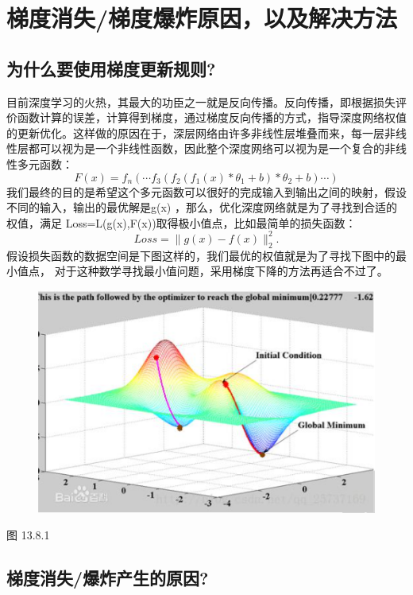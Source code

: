 \section{梯度消失/梯度爆炸原因，以及解决方法}\label{ux68afux5ea6ux6d88ux5931ux68afux5ea6ux7206ux70b8ux539fux56e0ux4ee5ux53caux89e3ux51b3ux65b9ux6cd5}

\subsection{为什么要使用梯度更新规则?}\label{ux4e3aux4ec0ux4e48ux8981ux4f7fux7528ux68afux5ea6ux66f4ux65b0ux89c4ux5219}

目前深度学习的火热，其最大的功臣之一就是反向传播。反向传播，即根据损失评价函数计算的误差，计算得到梯度，通过梯度反向传播的方式，指导深度网络权值的更新优化。这样做的原因在于，深层网络由许多非线性层堆叠而来，每一层非线性层都可以视为是一个非线性函数，因此整个深度网络可以视为是一个复合的非线性多元函数：
\[
F(x)=f_n(\cdots f_3(f_2(f_1(x)*\theta_1+b)*\theta_2+b)\cdots)
\]
我们最终的目的是希望这个多元函数可以很好的完成输入到输出之间的映射，假设不同的输入，输出的最优解是g(x)
，那么，优化深度网络就是为了寻找到合适的权值，满足
Loss=L(g(x),F(x))取得极小值点，比如最简单的损失函数： \[
Loss = \lVert g(x)-f(x) \rVert^2_2.
\]
假设损失函数的数据空间是下图这样的，我们最优的权值就是为了寻找下图中的最小值点，
对于这种数学寻找最小值问题，采用梯度下降的方法再适合不过了。

\begin{figure}
\centering
\includegraphics{./img/ch13/figure_13_15_1.png}
\caption{}
\end{figure}

图 13.8.1

\subsection{梯度消失/爆炸产生的原因?}\label{ux68afux5ea6ux6d88ux5931ux7206ux70b8ux4ea7ux751fux7684ux539fux56e0}

